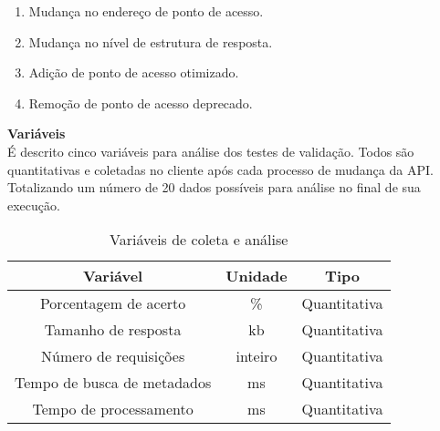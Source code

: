 \begin{enumerate}
\item Mudança no endereço de ponto de acesso.
\item Mudança no nível de estrutura de resposta.
\item Adição de ponto de acesso otimizado.
\item Remoção de ponto de acesso deprecado.
\end{enumerate}

\textbf{Variáveis} \\

É descrito cinco variáveis para análise dos testes de validação. Todos são quantitativas e coletadas no cliente após cada processo de mudança da API. Totalizando um número de 20 dados possíveis para análise no final de sua execução.

\begin{table}[H]
  \centering
  \begin{tabular}{|c|c|c|}
    \hline
    Variável & Unidade & Tipo \\
    \hline
    Porcentagem de acerto & \% & Quantitativa \\
    \hline
    Tamanho de resposta & kb & Quantitativa \\
    \hline
    Número de requisições & inteiro & Quantitativa \\
    \hline
    Tempo de busca de metadados & ms & Quantitativa \\
    \hline
    Tempo de processamento & ms & Quantitativa \\
    \hline
  \end{tabular}
  \caption{Variáveis de coleta e análise}
\end{table}

 
 
 
 
 
 

 
